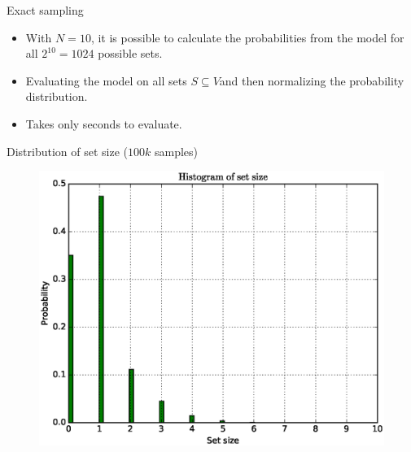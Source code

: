 \documentclass{beamer}
\begin{document}
\begin{frame}{Exact sampling}
  \begin{itemize}
    \item With $N = 10$, it is possible to calculate the probabilities from the model for all $2^{10} = 1024$ possible sets.
    \item Evaluating the model on all sets $S \subseteq V$and then normalizing the probability distribution.
    \item Takes only seconds to evaluate.
  \end{itemize}
\end{frame}

\begin{frame}{Distribution of set size ($100k$ samples)}
  \begin{figure}
    \centering
    \includegraphics[height=0.8\textheight]{length_histogram_exact}
  \end{figure}
\end{frame}
\end{document}
